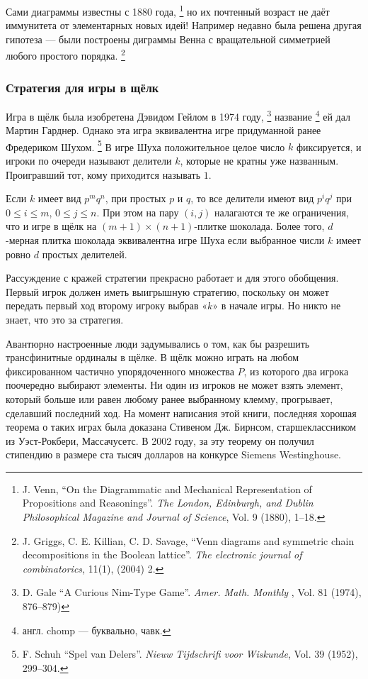 Сами диаграммы известны с 1880 года,%
\footnote{J. Venn,
``On the Diagrammatic and Mechanical Representation of Propositions and Reasonings''.
\emph{The London, Edinburgh, and Dublin Philosophical Magazine and Journal of Science}, Vol. 9 (1880),  1--18.}
но их почтенный возраст не даёт иммунитета от элементарных новых идей!
Например недавно была решена другая гипотеза --- были построены диграммы Венна с вращательной симметрией любого простого порядка.%
\footnote{J. Griggs, C. E. Killian, C. D. Savage, ``Venn diagrams and symmetric chain decompositions in the Boolean lattice''.
\emph{The electronic journal of combinatorics}, 11(1), (2004)  2.}

\subsubsection*{Стратегия для игры в щёлк}

Игра в щёлк была изобретена Дэвидом Гейлом в 1974 году,%
\footnote{D. Gale ``A Curious Nim-Type Game''. \emph{Amer. Math. Monthly }, Vol. 81 (1974), 876--879)}
 название%
\footnote{англ. chomp --- буквально, чавк.}
 ей дал Мартин Гарднер.
Однако эта игра эквивалентна игре придуманной ранее Фредериком Шухом.%
\footnote{F. Schuh ``Spel van Delers''. \emph{Nieuw Tijdschrifi voor Wiskunde}, Vol. 39 (1952), 299--304.}
В игре Шуха положительное целое число $k$ фиксируется, и игроки по очереди называют делители $k$, которые не кратны уже названным.
Проигравший тот, кому приходится называть $1$.

Если $k$ имеет вид $p^mq^n$, при простых $p$ и $q$, то все делители имеют вид $p^iq^j$ при $0 \le i \le m$, $0 \le j \le n$.
При этом на пару $(i,j)$ налагаются те же ограничения, что и игре в щёлк на $(m+1)\times(n+1)$-плитке шоколада.
Более того, $d$-мерная плитка шоколада эквивалентна игре Шуха если выбранное числи $k$ имеет ровно $d$ простых делителей.

Рассуждение с кражей стратегии прекрасно работает и для этого обобщения.
Первый игрок должен иметь выигрышную стратегию, поскольку он может передать первый ход второму игроку выбрав «$k$» в начале игры.
Но никто не знает, что это за стратегия.

Авантюрно настроенные люди задумывались о том, как бы разрешить трансфинитные ординалы в щёлке.
В щёлк можно играть на любом фиксированном частично упорядоченного множества $P$, из которого два игрока поочередно выбирают элементы.
Ни один из игроков не может взять элемент, который больше или равен любому ранее выбранному клемму, прогрывает, сделавший последний ход.
На момент написания этой книги, последняя хорошая теорема о таких играх была доказана Стивеном Дж. Бирнсом, старшеклассником из Уэст-Рокбери, Массачусетс.
В 2002 году, за эту теорему он получил стипендию в размере ста тысяч долларов на конкурсе Siemens Westinghouse.

